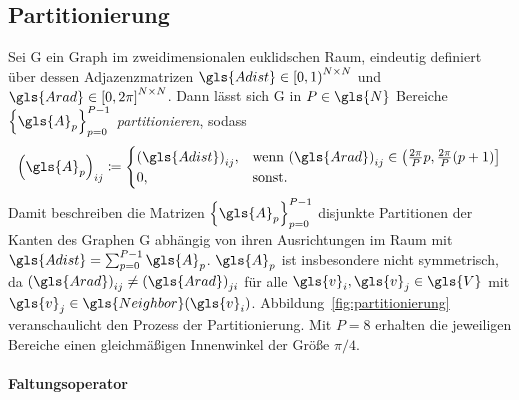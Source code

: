 \subsection{Partitionierung}
\label{partitionierung}



Sei \gls{G} ein Graph im zweidimensionalen euklidschen Raum, eindeutig definiert über dessen Adjazenzmatrizen $\gls{Adist} \in {\left[0, 1\right)}^{N \times N}$ und $\gls{Arad} \in {\left[0, 2\pi\right]}^{N \times N}$.
Dann lässt sich \gls{G} in $P \in \gls{N}$ Bereiche ${\left\{\gls{A}_p\right\}}_{p=0}^{P-1}$ \emph{partitionieren}, sodass
\begin{equation*}
  {\left(\gls{A}_p\right)}_{ij} \coloneqq \begin{cases}
    {\left(\gls{Adist}\right)}_{ij}, & \text{wenn } {\left(\gls{Arad}\right)}_{ij} \in \left(\frac{2\pi}{P}p, \frac{2\pi}{P}\left(p+1\right)\right]\\
    0, & \text{sonst.}
  \end{cases}
\end{equation*}
Damit beschreiben die Matrizen ${\left\{\gls{A}_p\right\}}_{p=0}^{P-1}$ disjunkte Partitionen der Kanten des Graphen \gls{G} abhängig von ihren Ausrichtungen im Raum mit $\gls{Adist} = \sum_{p=0}^{P-1} \gls{A}_p$.
$\gls{A}_p$ ist insbesondere nicht symmetrisch, da ${\left(\gls{Arad}\right)}_{ij} \neq {\left(\gls{Arad}\right)}_{ji}$ für alle $\gls{v}_i, \gls{v}_j \in \gls{V}$ mit $\gls{v}_j \in \gls{Neighbor}\left(\gls{v}_i\right)$.
Abbildung~\ref{fig:partitionierung} veranschaulicht den Prozess der Partitionierung.
Mit $P = 8$ erhalten die jeweiligen Bereiche \zB{} einen gleichmäßigen Innenwinkel der Größe $\pi/4$.

\paragraph{Faltungsoperator}
\label{partitionierung_faltungsoperator}

